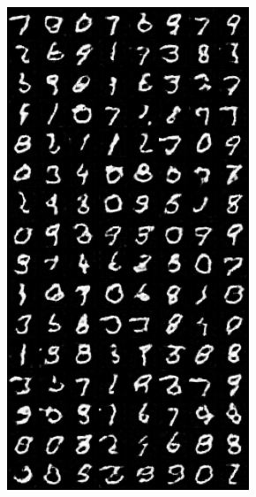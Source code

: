 \begin{figure}[H]
    \centering

    \begin{subfigure}{0.2\textwidth}
        \centering
        \includegraphics[width=0.95\linewidth]{ngf/8/fake_sample_epoch_0010.png}
        \caption{}
        \label{subfig:ngf/8/fake_sample_epoch_0010.png}
    \end{subfigure}%

\end{figure}

